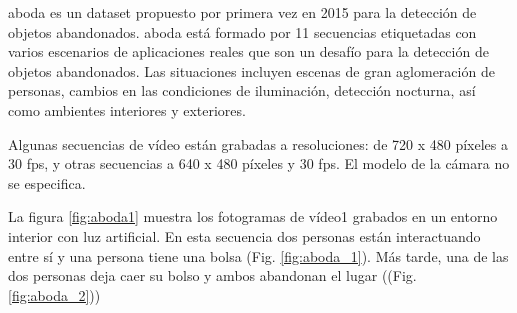 \gls{aboda} \cite{aboda-dataset} es un dataset propuesto por primera vez en 2015 para la detección de objetos abandonados. \gls{aboda} está formado por 11 secuencias etiquetadas con varios escenarios de aplicaciones reales que son un desafío para la detección de objetos abandonados. Las situaciones incluyen escenas de gran aglomeración de personas, cambios en las condiciones de iluminación, detección nocturna, así como ambientes interiores y exteriores.

Algunas secuencias de vídeo están grabadas a resoluciones: de 720 x 480 píxeles a 30 \gls{fps}, y otras secuencias a 640 x 480 píxeles y 30 \gls{fps}. El modelo de la cámara no se especifica.

La figura \ref{fig:aboda1} muestra los fotogramas de vídeo1 grabados en un entorno interior con luz artificial. En esta secuencia dos personas están interactuando entre sí y una persona tiene una bolsa (Fig. \ref{fig:aboda_1}). Más tarde, una de las dos personas deja caer su bolso y ambos abandonan el lugar ((Fig. \ref{fig:aboda_2}))

